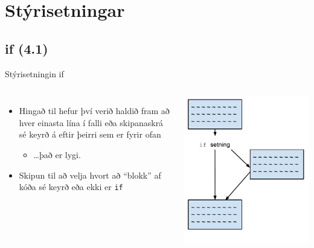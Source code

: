 \documentclass{beamer}
\begin{document}
\section{Stýrisetningar}

\subsection{if (4.1)}

\begin{frame}{Stýrisetningin if}
\begin{columns}
\begin{itemize}
 \item Hingað til hefur því verið haldið fram að hver einasta lína í falli eða skipanaskrá sé keyrð á eftir þeirri sem er fyrir ofan \pause
 \begin{itemize}
  \item \ldots það er lygi. \pause
 \end{itemize}
 \item Skipun til að velja hvort að ``blokk'' af kóða sé keyrð eða ekki er \texttt{if}
\end{itemize}
\begin{center}
 \includegraphics[width=0.8\linewidth]{../Pics/if}
\end{center}
\end{columns}
\end{frame}
\end{document}
